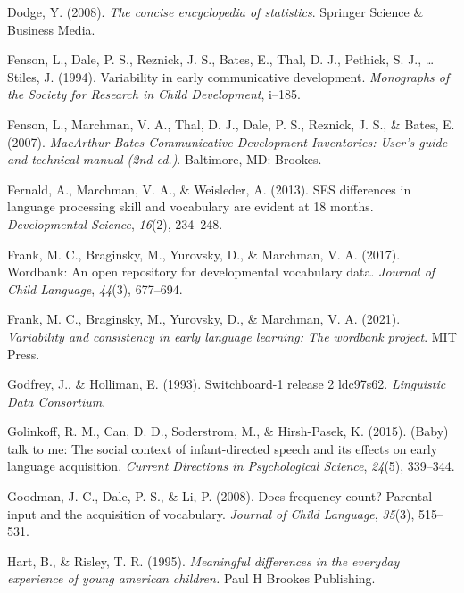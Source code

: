 \documentclass[10pt, letterpaper]{article}
\begin{document}
\leavevmode\hypertarget{ref-dodge2008concise}{}%
Dodge, Y. (2008). \emph{The concise encyclopedia of statistics}.
Springer Science \& Business Media.

\leavevmode\hypertarget{ref-fenson1994variability}{}%
Fenson, L., Dale, P. S., Reznick, J. S., Bates, E., Thal, D. J.,
Pethick, S. J., \ldots{} Stiles, J. (1994). Variability in early
communicative development. \emph{Monographs of the Society for Research
in Child Development}, i--185.

\leavevmode\hypertarget{ref-fenson2007}{}%
Fenson, L., Marchman, V. A., Thal, D. J., Dale, P. S., Reznick, J. S.,
\& Bates, E. (2007). \emph{MacArthur-Bates Communicative Development
Inventories: User's guide and technical manual (2nd ed.)}. Baltimore,
MD: Brookes.

\leavevmode\hypertarget{ref-fernald2013ses}{}%
Fernald, A., Marchman, V. A., \& Weisleder, A. (2013). SES differences
in language processing skill and vocabulary are evident at 18 months.
\emph{Developmental Science}, \emph{16}(2), 234--248.

\leavevmode\hypertarget{ref-frank2017wordbank}{}%
Frank, M. C., Braginsky, M., Yurovsky, D., \& Marchman, V. A. (2017).
Wordbank: An open repository for developmental vocabulary data.
\emph{Journal of Child Language}, \emph{44}(3), 677--694.

\leavevmode\hypertarget{ref-frank2021}{}%
Frank, M. C., Braginsky, M., Yurovsky, D., \& Marchman, V. A. (2021).
\emph{Variability and consistency in early language learning: The
wordbank project}. MIT Press.

\leavevmode\hypertarget{ref-godfrey1993switchboard}{}%
Godfrey, J., \& Holliman, E. (1993). Switchboard-1 release 2 ldc97s62.
\emph{Linguistic Data Consortium}.

\leavevmode\hypertarget{ref-golinkoff2015baby}{}%
Golinkoff, R. M., Can, D. D., Soderstrom, M., \& Hirsh-Pasek, K. (2015).
(Baby) talk to me: The social context of infant-directed speech and its
effects on early language acquisition. \emph{Current Directions in
Psychological Science}, \emph{24}(5), 339--344.

\leavevmode\hypertarget{ref-goodman2008}{}%
Goodman, J. C., Dale, P. S., \& Li, P. (2008). Does frequency count?
Parental input and the acquisition of vocabulary. \emph{Journal of Child
Language}, \emph{35}(3), 515--531.

\leavevmode\hypertarget{ref-hart1995meaningful}{}%
Hart, B., \& Risley, T. R. (1995). \emph{Meaningful differences in the
everyday experience of young american children.} Paul H Brookes
Publishing.
\end{document}
